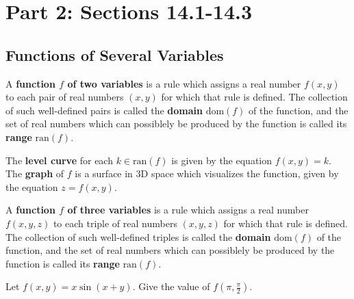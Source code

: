 \documentclass[letterpaper, twoside, 12pt]{book}
\begin{document}
\setcounter{chapter}{1}

\chapter{Part 2: Sections 14.1-14.3}

\setcounter{chapter}{14}
\setcounter{section}{0}

\section{Functions of Several Variables} %

\begin{definition}
  A \textbf{function $f$ of two variables} is a rule which assigns a
  real number $f(x,y)$ to each pair of real numbers $(x,y)$ for which
  that rule is defined.
  The collection of such well-defined pairs is called the
  \textbf{domain} $\text{dom}(f)$ of the function, and the set of
  real numbers which
  can possiblely be produced by the function is called its
  \textbf{range} $\text{ran}(f)$.
\end{definition}

\begin{definition}
  The \textbf{level curve} for each $k\in\text{ran}(f)$ is given by the
  equation $f(x,y)=k$.
  The \textbf{graph} of $f$ is a surface in 3D space which visualizes the function, given by the equation $z=f(x,y)$.
\end{definition}

\begin{definition}
  A \textbf{function $f$ of three variables} is a rule which assigns a
  real number $f(x,y,z)$ to each triple of real numbers $(x,y,z)$ for which
  that rule is defined.
  The collection of such well-defined triples is called the
  \textbf{domain} $\text{dom}(f)$ of the function, and the set of
  real numbers which
  can possiblely be produced by the function is called its
  \textbf{range} $\text{ran}(f)$.
\end{definition}

          \begin{problem}
            Let $f(x,y)=x\sin(x+y)$. Give the value of $f(\pi,\frac{\pi}{2})$.
          \end{problem}

          \begin{solution}

          \end{solution}
\end{document}
